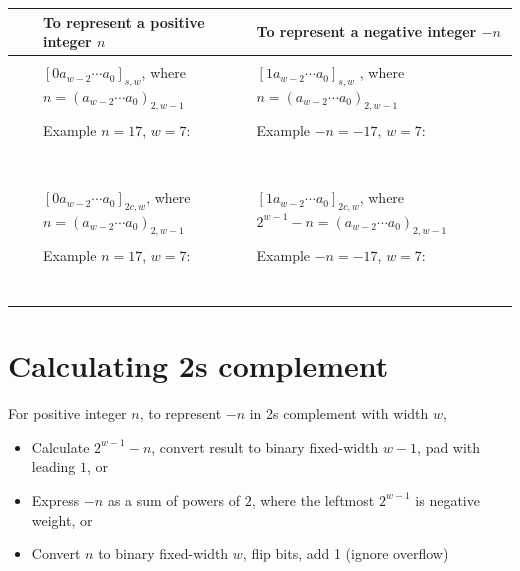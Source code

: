 \documentclass[12pt, oneside]{article}
\begin{document}
\begin{tabular}{|cc|p{3.4in}|p{3.7in}|}
\hline
& & To  represent a positive integer $n$ & To represent a negative integer $-n$\\
\hline
&& &  \\
&\parbox[t]{2mm}{} &
$[ 0a_{w-2} \cdots a_0]_{s,w}$, where $n =  (a_{w-2} \cdots a_0)_{2,w-1}$& 
$[1a_{w-2} \cdots a_0]_{s,w}$
, where $n =  (a_{w-2} \cdots a_0)_{2,w-1}$\\
&& & \\
&& Example $n=17$, $w=7$:  & Example $-n=-17$, $w=7$: \\
&& & \\
&& & \\
&& & \\
&& & \\
&& & \\
&& & \\
&& & \\
\hline
&&  &  \\
&\parbox[t]{2mm}{} &
$[0a_{w-2} \cdots a_0]_{2c,w}$, where $n =  (a_{w-2} \cdots a_0)_{2,w-1}$& $[1a_{w-2} \cdots a_0]_{2c,w}$, where $2^{w-1} - n =  (a_{w-2} \cdots a_0)_{2,w-1}$\\
&& & \\
&& Example $n=17$, $w=7$:  & Example $-n=-17$, $w=7$: \\
&& & \\
&& & \\
&& & \\
&& & \\
&& & \\
&& & \\
&& & \\
\hline
\end{tabular} \vfill
\section*{Calculating 2s complement}


For positive integer $n$, to represent $-n$ in 
2s complement with width $w$,
\begin{itemize}
    \item Calculate $2^{w-1} - n$, convert 
    result to binary fixed-width $w-1$, pad 
    with leading $1$, or
    \item Express $-n$ as a sum of powers of $2$, 
    where the leftmost $2^{w-1}$ is negative weight, or
    \item Convert $n$ to binary fixed-width $w$, 
    flip bits, add 1 (ignore overflow)
\end{itemize}
\end{document}
